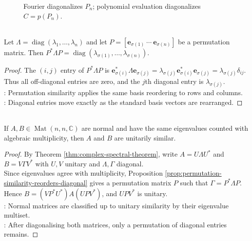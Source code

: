 \begin{figure}[H]
  \centering
  
  \caption{Fourier diagonalizes $P_n$; polynomial evaluation diagonalizes $C=p(P_n)$.}
  \label{fig:circulant-fourier-diagonalization}
\end{figure}

\begin{proposition} \label{prop:permutation-similarity-reorders-diagonal} \\
Let $\Lambda=\operatorname{diag}(\lambda_1,\ldots,\lambda_n)$ and let $P=[\mathbf{e}_{\sigma(1)}\ \cdots\ \mathbf{e}_{\sigma(n)}]$ be a permutation matrix. Then $P^*\Lambda P=\operatorname{diag}(\lambda_{\sigma(1)},\ldots,\lambda_{\sigma(n)})$.
\begin{proof}
The $(i,j)$ entry of $P^*\Lambda P$ is $\mathbf{e}_{\sigma(i)}^*\Lambda\mathbf{e}_{\sigma(j)} =\lambda_{\sigma(j)}\mathbf{e}_{\sigma(i)}^*\mathbf{e}_{\sigma(j)} =\lambda_{\sigma(j)}\delta_{ij}$.\\
Thus all off-diagonal entries are zero, and the $j$th diagonal entry is $\lambda_{\sigma(j)}$.\\
: Permutation similarity applies the same basis reordering to rows and columns.\\
: Diagonal entries move exactly as the standard basis vectors are rearranged.
\end{proof}
\end{proposition}

\begin{corollary} \label{cor:normal-matrices-same-spectrum-unitarily-similar} \\
If $A,B\in\operatorname{Mat}(n,n,\mathbb{C})$ are normal and have the same eigenvalues counted with algebraic multiplicity, then $A$ and $B$ are unitarily similar.
\begin{proof}
By Theorem \ref{thm:complex-spectral-theorem}, write $A=U\Lambda U^*$ and $B=V\Gamma V^*$ with $U,V$ unitary and $\Lambda,\Gamma$ diagonal.\\
Since eigenvalues agree with multiplicity, Proposition \ref{prop:permutation-similarity-reorders-diagonal} gives a permutation matrix $P$ such that $\Gamma=P^*\Lambda P$.\\
Hence $B=(VP^*U^*)A(UPV^*)$, and $UPV^*$ is unitary.\\
: Normal matrices are classified up to unitary similarity by their eigenvalue multiset.\\
: After diagonalising both matrices, only a permutation of diagonal entries remains.
\end{proof}
\end{corollary}

